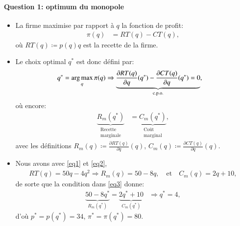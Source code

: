 \begin{frame}
[allowframebreaks]{\insertsection}
\framesubtitle{Question 1: optimum du monopole}
\begin{itemize}
\item La firme maximise par rapport à $q$  la fonction de profit:
\begin{align}
\pi(q) &= RT(q) - CT(q),
\label{eq3}
\end{align}
où $RT(q) \coloneqq p(q)q$ est la recette de la firme. 
\item Le choix optimal $q^*$  est donc défini par:
\begin{align}
q^* &=\argmax_q \pi(q) \Rightarrow \underbrace{\frac{\partial RT(q)}{\partial q}(q^*) -  \frac{\partial CT(q)}{\partial q}(q^*) = 0}_{\text{c.p.o.}}, 
\label{eq3}
\end{align}
où encore:
\begin{align*}
\underbrace{R_m(q^*)}_{\substack{\text{Recette} \\ \text{marginale}}} &= \underbrace{C_m(q^*)}_{\substack{\text{Coût} \\ \text{marginal}}}, 
\end{align*}
avec les définitions $R_m(q)\coloneqq \frac{\partial RT(q)}{\partial q}(q)$,  $C_m(q)\coloneqq \frac{\partial CT(q)}{\partial q}(q)$.

\item Nous avons avec \eqref{eq1} et \eqref{eq2},
\begin{align*}
RT(q) =  50q-4q^2 \Rightarrow R_m(q) = 50-8q, \quad \text{et} \quad C_m(q) = 2q + 10,
\end{align*}
de sorte que la condition dans \eqref{eq3} donne:
\begin{align*}
\underbrace{50-8q^*}_{R_m(q^*)} = \underbrace{2q^* + 10}_{C_m(q^*)}  &\Rightarrow q^* = 4,
\end{align*}
d'où $p^* = p(q^*) =  34$, $\pi^* = \pi(q^*) = 80$.
\end{itemize}
\end{frame}

